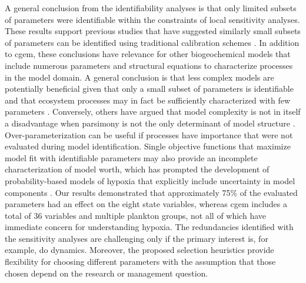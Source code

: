 \documentclass[review]{elsarticle}\usepackage[]{graphicx}\usepackage[]{color}
\begin{document}
A general conclusion from the identifiability analyses is that only limited subsets of parameters were identifiable within the constraints of local sensitivity analyses. These results support previous studies that have suggested similarly small subsets of parameters can be identified using traditional calibration schemes \citep[e.g.,][]{Wheater86,Ye97,Omlin01}.  In addition to \ac{cgem}, these conclusions have relevance for other biogeochemical models that include numerous parameters and structural equations to characterize processes in the model domain.  A general conclusion is that less complex models are potentially beneficial given that only a small subset of parameters is identifiable and that ecosystem processes may in fact be sufficiently characterized with few parameters \citep{Ye97}.  Conversely, others have argued that model complexity is not in itself a disadvantage when parsimony is not the only determinant of model structure \citep{Reichert97}. Over-parameterization can be useful if processes have importance that were not evaluated during model identification.  Single objective functions that maximize model fit with identifiable parameters may also provide an incomplete characterization of model worth, which has prompted the development of probability-based models of hypoxia that explicitly include uncertainty in model components \citep[e.g.][]{Obenour15}.  Our results demonstrated that approximately 75\% of the evaluated parameters had an effect on the eight state variables, whereas \ac{cgem} includes a total of 36 variables and multiple plankton groups, not all of which have immediate concern for understanding hypoxia. The redundancies identified with the sensitivity analyses are challenging only if the primary interest is, for example, \ac{do} dynamics.  Moreover, the proposed selection heuristics provide flexibility for choosing different parameters with the assumption that those chosen depend on the research or management question. 
\end{document}
